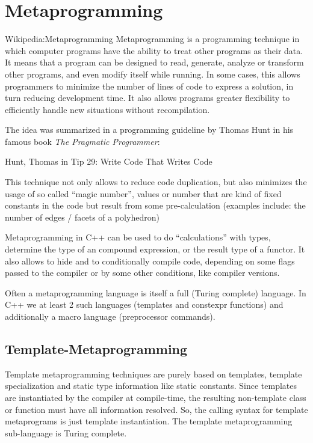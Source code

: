 \chapter{Metaprogramming}
\begin{zitat}{Wikipedia:Metaprogramming}
  Metaprogramming is a programming technique in which computer programs have the ability to treat other programs as their data.
  It means that a program can be designed to read, generate, analyze or transform other programs, and even modify itself while
  running. In some cases, this allows programmers to minimize the number of lines of code to express a solution, in turn reducing
  development time. It also allows programs greater flexibility to efficiently handle new situations without recompilation.
\end{zitat}

The idea was summarized in a programming guideline by Thomas Hunt in his famous book \emph{The Pragmatic Programmer}:
\begin{zitat}{Hunt, Thomas in \cite{hunt1999}}
  Tip 29: Write Code That Writes Code
\end{zitat}

This technique not only allows to reduce code duplication, but also minimizes the usage of so called ``magic number'', \ie values or number
that are kind of fixed constants in the code but result from some pre-calculation (examples include: the number of edges / facets of a polyhedron)

Metaprogramming in C++ can be used to do ``calculations'' with types, \eg determine the type of an compound expression, or the result type of
a functor. It also allows to hide and to conditionally compile code, depending on some flags passed to the compiler or by some other conditions,
like compiler versions.

Often a metaprogramming language is itself a full (Turing complete) language. In C++ we at least 2 such languages (templates and constexpr functions)
and additionally a macro language (preprocessor commands).


\section{Template-Metaprogramming}
Template metaprogramming techniques are purely based on templates, template specialization and static type information like static constants. Since
templates are instantiated by the compiler at compile-time, the resulting non-template class or function must have all information resolved. So, the
calling syntax for template metaprograms is just template instantiation. The template metaprogramming sub-language is Turing complete.

